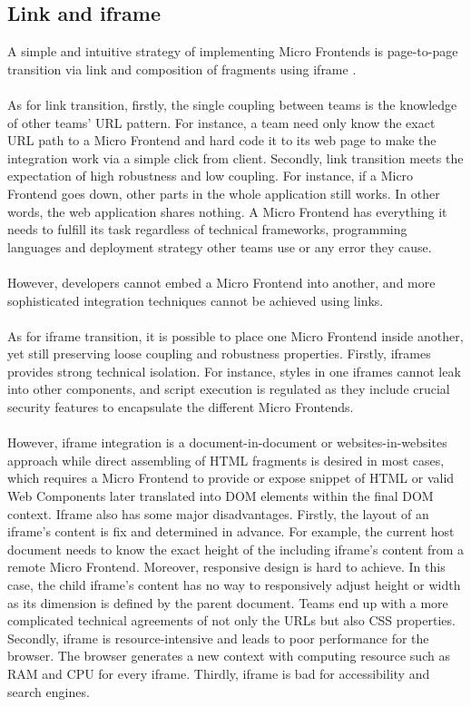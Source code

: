 \documentclass[a4paper]{book}
\begin{document}
\subsection{Link and iframe}
A simple and intuitive strategy of implementing Micro Frontends is page-to-page transition via link and composition of fragments using iframe \cite{iframe}.
\\ \\
As for link transition, firstly, the single coupling between teams is the knowledge of other teams’ URL pattern. For instance, a team need only know the exact URL path to a Micro Frontend and hard code it to its web page to make the integration work via a simple click from client. Secondly, link transition meets the expectation of high robustness and low coupling. For instance, if a Micro Frontend goes down, other parts in the whole application still works. In other words, the web application shares nothing. A Micro Frontend has everything it needs to fulfill its task regardless of technical frameworks, programming languages and deployment strategy other teams use or any error they cause.
\\ \\
However, developers cannot embed a Micro Frontend into another, and more sophisticated integration techniques cannot be achieved using links. 
\\ \\
As for iframe transition, it is possible to place one Micro Frontend inside another, yet still preserving loose coupling and robustness properties. Firstly, iframes provides strong technical isolation. For instance, styles in one iframes cannot leak into other components, and script execution is regulated as they include crucial security features to encapsulate the different Micro Frontends.
\\ \\
However, iframe integration is a document-in-document or websites-in-websites approach while direct assembling of HTML fragments is desired in most cases, which requires a Micro Frontend to provide or expose snippet of HTML or valid Web Components later translated into DOM elements within the final DOM context. Iframe also has some major        disadvantages. Firstly, the layout of an iframe’s content is fix and determined in advance. For example, the current host document needs to know the exact height of the including iframe’s content from a remote Micro Frontend. Moreover, responsive design is hard to achieve. In this case, the child iframe’s content has no way to responsively adjust height or width as its dimension is defined by the parent document. Teams end up with a more complicated technical agreements of not only the URLs but also CSS properties. Secondly, iframe is resource-intensive and leads to poor performance for the browser. The browser generates a new context with computing resource such as RAM and CPU for every iframe. Thirdly, iframe is bad for accessibility and search engines.
\end{document}
